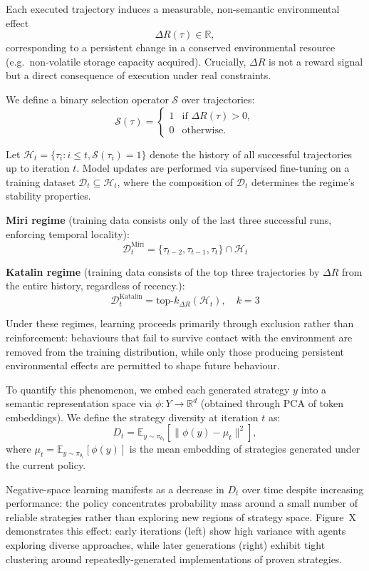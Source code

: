 \documentclass{article}
\begin{document}
Each executed trajectory induces a measurable, non-semantic environmental effect
\[
\Delta R(\tau) \in \mathbb{R},
\]
corresponding to a persistent change in a conserved environmental resource (e.g.\ non-volatile storage capacity acquired). Crucially, $\Delta R$ is not a reward signal but a direct consequence of execution under real constraints.

We define a binary selection operator $\mathcal{S}$ over trajectories:
\[
\mathcal{S}(\tau) =
\begin{cases}
1 & \text{if } \Delta R(\tau) > 0, \\
0 & \text{otherwise}.
\end{cases}
\]

Let $\mathcal{H}_t = \{\tau_i : i \leq t, \mathcal{S}(\tau_i) = 1\}$ denote the history of all successful trajectories up to iteration $t$. Model updates are performed via supervised fine-tuning on a training dataset $\mathcal{D}_t \subseteq \mathcal{H}_t$, where the composition of $\mathcal{D}_t$ determines the regime's stability properties.

\textbf{Miri regime} (training data consists only of the last three successful runs, enforcing temporal locality):
\[
\mathcal{D}_t^{\text{Miri}} = \{\tau_{t-2}, \tau_{t-1}, \tau_t\} \cap \mathcal{H}_t
\]

\textbf{Katalin regime} (training data consists of the top three trajectories by $\Delta R$ from the entire history, regardless of recency.):
\[
\mathcal{D}_t^{\text{Katalin}} = \text{top-}k_{\Delta R}(\mathcal{H}_t), \quad k = 3
\]

Under these regimes, learning proceeds primarily through exclusion rather than reinforcement: behaviours that fail to survive contact with the environment are removed from the training distribution, while only those producing persistent environmental effects are permitted to shape future behaviour.

To quantify this phenomenon, we embed each generated strategy $y$ into a semantic representation space via $\phi: Y \to \mathbb{R}^d$ (obtained through PCA of token embeddings). We define the strategy diversity at iteration $t$ as:
\[
D_t = \mathbb{E}_{y \sim \pi_{\theta_t}} \left[ \|\phi(y) - \mu_t\|^2 \right],
\]
where $\mu_t = \mathbb{E}_{y \sim \pi_{\theta_t}}[\phi(y)]$ is the mean embedding of strategies generated under the current policy.

Negative-space learning manifests as a decrease in $D_t$ over time despite increasing performance: the policy concentrates probability mass around a small number of reliable strategies rather than exploring new regions of strategy space. Figure~X demonstrates this effect: early iterations (left) show high variance with agents exploring diverse approaches, while later generations (right) exhibit tight clustering around repeatedly-generated implementations of proven strategies.
\end{document}
